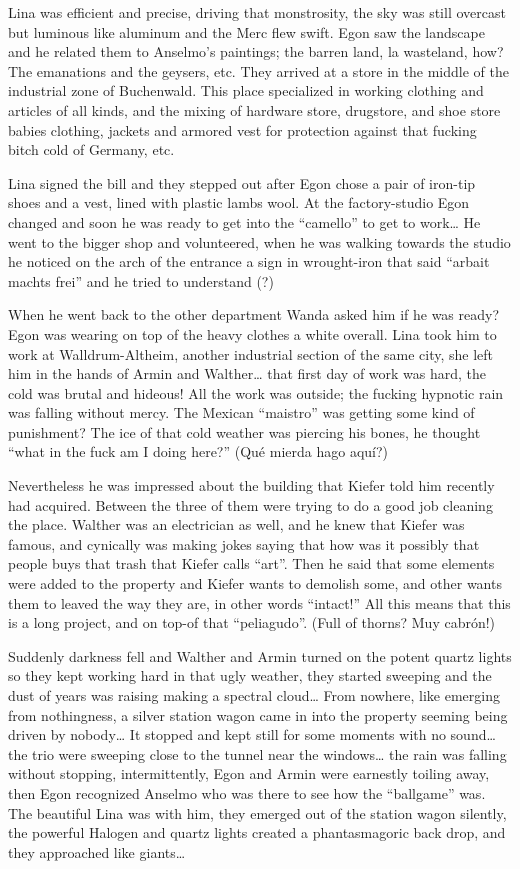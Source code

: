 \documentclass[smalldemyvopaper,11pt,twoside,onecolumn,openright,extrafontsizes]{memoir}
\newlength\drop
\begin{document}
Lina was efficient and precise, driving that monstrosity, the sky was still overcast but luminous like aluminum and the Merc flew swift. Egon saw the landscape and he related them to Anselmo’s paintings; the barren land, la wasteland, how? The emanations and the geysers, etc. They arrived at a store in the middle of the industrial zone of Buchenwald. This place specialized in working clothing and articles of all kinds, and the mixing of hardware store, drugstore, and shoe store babies clothing, jackets and armored vest for protection against that fucking bitch cold of Germany, etc. 

Lina signed the bill and they stepped out after Egon chose a pair of iron-tip shoes and a vest, lined with plastic lambs wool. At the factory-studio Egon changed and soon he was ready to get into the “camello” to get to work… He went to the bigger shop and volunteered, when he was walking towards the studio he noticed on the arch of the entrance a sign in wrought-iron that said “arbait machts frei” and he tried to understand (?)

When he went back to the other department Wanda asked him if he was ready? Egon was wearing on top of the heavy clothes a white overall. Lina took him to work at Walldrum-Altheim, another industrial section of the same city, she left him in the hands of Armin and Walther… that first day of work was hard, the cold was brutal and hideous! All the work was outside; the fucking hypnotic rain was falling without mercy. The Mexican “maistro” was getting some kind of punishment? The ice of that cold weather was piercing his bones, he thought “what in the fuck am I doing here?” (Qué mierda hago aquí?)

Nevertheless he was impressed about the building that Kiefer told him recently had acquired. Between the three of them were trying to do a good job cleaning the place. Walther was an electrician as well, and he knew that Kiefer was famous, and cynically was making jokes saying that how was it possibly that people buys that trash that Kiefer calls “art”. Then he said that some elements were added to the property and Kiefer wants to demolish some, and other wants them to leaved the way they are, in other words “intact!” All this means that this is a long project, and on top-of that “peliagudo”. (Full of thorns? Muy cabrón!)

Suddenly darkness fell and Walther and Armin turned on the potent quartz lights so they kept working hard in that ugly weather, they started sweeping and the dust of years was raising making a spectral cloud… From nowhere, like emerging from nothingness, a silver station wagon came in into the property seeming being driven by nobody… It stopped and kept still for some moments with no sound… the trio were sweeping close to the tunnel near the windows… the rain was falling without stopping, intermittently, Egon and Armin were earnestly toiling away, then Egon recognized Anselmo who was there to see how the “ballgame” was. The beautiful Lina was with him, they emerged out of the station wagon silently, the powerful Halogen and quartz lights created a phantasmagoric back drop, and they approached like giants…
\end{document}
